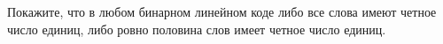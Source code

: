 Покажите, что в любом бинарном линейном коде либо все слова имеют четное число единиц, либо ровно
половина слов имеет четное число единиц.
